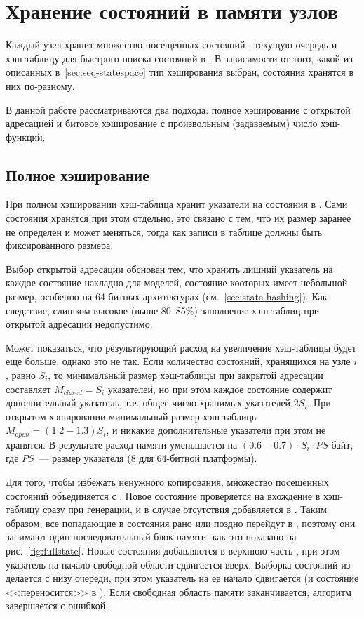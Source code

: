 \chapter{Хранение состояний в памяти узлов}
\label{cha:par-state-store}

Каждый узел хранит множество посещенных состояний , текущую очередь
 и хэш-таблицу для быстрого поиска состояний в . В зависимости
от того, какой из описанных в~\ref{sec:seq-statespace} тип хэширования выбран, состояния
хранятся в них по-разному.

В данной работе рассматриваются два подхода: полное хэширование с открытой адресацией и
битовое хэширование с произвольным (задаваемым) число хэш-функций.

\section{Полное хэширование}
\label{sec:fullhash-store}

При полном хэшировании хэш-таблица хранит указатели на состояния в . Сами
состояния хранятся при этом отдельно, это связано с тем, что их размер заранее не
определен и может меняться, тогда как записи в таблице должны быть фиксированного размера.

Выбор открытой адресации обснован тем, что хранить лишний указатель на каждое состояние
накладно для моделей, состояние кооторых имеет небольшой размер, особенно на 64-битных
архитектурах (см.~\ref{sec:state-hashing}). Как следствие, слишком высокое (выше 80--85\%)
заполнение хэш-таблиц при открытой адресации недопустимо. 

Может показаться, что результирующий расход на увеличение хэш-таблицы будет еще больше,
однако это не так. Если количество состояний, хранящихся на узле $i$, равно $S_i$, то
минимальный размер хэш-таблицы при закрытой адресации составляет $M_{closed} = S_i$
указателей, но при этом каждое состояние содержит дополнительный указатель, т.е. общее
число хранимых указателей $2 S_i$. При открытом хэшировании минимальный размер хэш-таблицы
$M_{open} = (1.2-1.3)S_i$, и никакие дополнительные указатели при этом не хранятся. В
результате расход памяти уменьшается на $(0.6-0.7)\cdot S_i\cdot PS$ байт, где $PS$~---
размер указателя ($8$ для 64-битной платформы).

Для того, чтобы избежать ненужного копирования, множество посещенных состояний
 объединяется с . Новое состояние проверяется на вхождение в
хэш-таблицу сразу при генерации, и в случае отсутствия добавляется в . Таким
образом, все попадающие в  состояния рано или поздно перейдут в
, поэтому они занимают один последовательный блок памяти, как это показано
на рис.~\ref{fig:fullstate}. Новые состояния добавляются в верхнюю часть ,
при этом указатель на начало свободной области сдвигается вверх. Выборка состояний из
 делается с низу очереди, при этом указатель на ее начало сдвигается (и
состояние <<переносится>> в ). Если свободная область памяти заканчивается,
алгоритм завершается с ошибкой.

